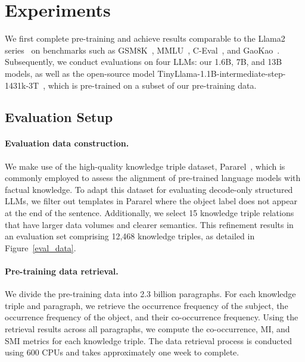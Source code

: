









% 


\section{Experiments}
\label{experiments}
We first complete pre-training and achieve results comparable to the Llama2 series~\cite{DBLP:journals/corr/abs-2307-09288} on benchmarks such as GSM8K~\cite{cobbe2021gsm8k}, MMLU~\cite{DBLP:conf/iclr/HendrycksBBZMSS21}, C-Eval~\cite{huang2023ceval}, and GaoKao~\cite{DBLP:journals/corr/abs-2305-12474}. Subsequently, we conduct evaluations on four LLMs: our 1.6B, 7B, and 13B models, as well as the open-source model TinyLlama-1.1B-intermediate-step-1431k-3T~\cite{DBLP:journals/corr/abs-2401-02385}, which is pre-trained on a subset of our pre-training data.


\subsection{Evaluation Setup}
\label{evaluation_setup}

\paragraph{Evaluation data construction.} 
We make use of the high-quality knowledge triple dataset, Pararel~\cite{DBLP:journals/tacl/ElazarKRRHSG21}, which is commonly employed to assess the alignment of pre-trained language models with factual knowledge. To adapt this dataset for evaluating decode-only structured LLMs, we filter out templates in Pararel where the object label does not appear at the end of the sentence. Additionally, we select 15 knowledge triple relations that have larger data volumes and clearer semantics. This refinement results in an evaluation set comprising 12,468 knowledge triples, as detailed in Figure~\ref{eval_data}.

\paragraph{Pre-training data retrieval.} 
We divide the pre-training data into 2.3 billion paragraphs. For each knowledge triple and paragraph, we retrieve the occurrence frequency of the subject, the occurrence frequency of the object, and their co-occurrence frequency. Using the retrieval results across all paragraphs, we compute the co-occurrence, MI, and SMI metrics for each knowledge triple. The data retrieval process is conducted using 600 CPUs and takes approximately one week to complete.

